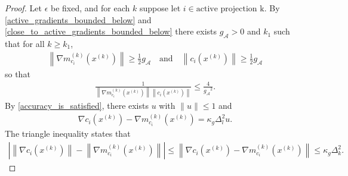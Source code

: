 \documentclass{article}
\newenvironment{comment}
  {\par\medskip
   \color{red}%
   \begin{framed}
   \textbf{Comment: }\ignorespaces}
 {\end{framed}
  \medskip}
\theoremstyle{case}
\numberwithin{theorem}{subsection}
\newcommand{\dk}{\Delta_k}
\newcommand{\gmcik}{{\nabla m_{c_i}^{(k)}\left(\xk\right)}}
\newcommand{\maxgrad}{{M_{\nabla}}}
\newcommand{\minactivegrad}{{ g_{\mathcal A} }}
\newcommand{\xk}{x^{(k)}}
\newcommand{\activeprojk}{{\textrm{active projection k}}}
\begin{document}
\begin{proof}

Let $\epsilon$ be fixed, and for each $k$ suppose let $i \in \activeprojk$.
By \cref{active_gradients_bounded_below} and \cref{close_to_active_gradients_bounded_below} there exists $\minactivegrad > 0$ and $k_1$ such that for all $k \ge k_1$,
\begin{align*}
\left\|\gmcik \right\| \ge \frac 1 2 \minactivegrad
\quad \textrm{and} \quad
\left\|c_i\left(\xk\right)\right\| \ge \frac 1 2 \minactivegrad
\end{align*}
so that
\begin{align}
\frac {1} {\left\|\gmcik \right\|  \left\|c_i\left(\xk\right)\right\|  } \le \frac 4 {\minactivegrad^2}. \label{zikac_what_i_need_to_multiply}
\end{align}
By \cref{accuracy_is_satisfied}, there exists $u$ with $\|u\| \le 1$ and
\begin{align*}
\nabla c_i\left( \xk \right) - \gmcik = \kappa_g \Delta_{l}^2 u.
\end{align*}
The triangle inequality states that
\begin{align}
\label{zikac_asdfasdffdsafdsa}
\left|\left\|\nabla c_i\left(\xk \right)\right\|  - \left\|\gmcik\right\|\right| \le \left\|\nabla c_i\left( \xk \right) - \gmcik\right\| \le \kappa_g \dk^2.
\end{align}

\end{proof}
\end{document}
